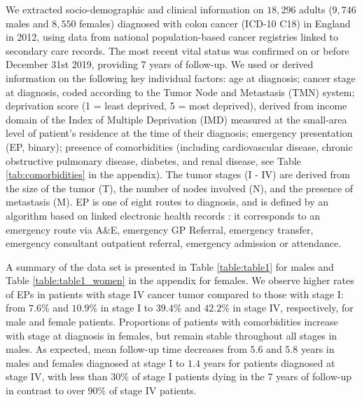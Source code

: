 \documentclass[12pt]{article}
\begin{document}

We extracted socio-demographic and clinical information on $18,296$ adults ($9,746$ males and $8,550$ females) diagnosed with colon cancer (ICD-10 C18) in England in 2012, using data from national population-based cancer registries linked to secondary care records. The most recent vital status was confirmed on or before December 31st 2019, providing 7 years of follow-up. 
We used or derived information on the following key individual factors: age at diagnosis; cancer stage at diagnosis, coded according to the Tumor Node and Metastasis (TMN) system; deprivation score (1 = least deprived, 5 = most deprived), derived from income domain of the Index of Multiple Deprivation (IMD) measured at the small-area level of patient's residence at the time of their diagnosis; emergency presentation (EP, binary); presence of comorbidities (including cardiovascular disease, chronic obstructive pulmonary disease, diabetes, and renal disease, see Table \ref{tab:comorbidities} in the appendix). The tumor stages (I - IV) are derived from the size of the tumor (T), the number of nodes involved (N), and the presence of metastasis (M). EP is one of eight routes to diagnosis, and is defined by an algorithm based on linked electronic health records \citep{elliss:2012}: it corresponds to an emergency route via A\&E, emergency GP Referral, emergency transfer, emergency consultant outpatient referral, emergency admission or attendance.

A summary of the data set is presented in Table \ref{table:table1} for males and Table \ref{table:table1_women} in the appendix for females. We observe higher rates of EPs in patients with stage IV cancer tumor compared to those with stage I: from $7.6\%$ and $10.9\%$ in stage I to $39.4\%$ and $42.2\%$ in stage IV, respectively, for male and female patients. Proportions of patients with comorbidities increase with stage at diagnosis in females, but remain stable throughout all stages in males. As expected, mean follow-up time decreases from $5.6$ and $5.8$ years in males and females diagnosed at stage I to $1.4$ years for patients diagnosed at stage IV, with less than $30\%$ of stage I patients dying in the 7 years of follow-up in contrast to over $90\%$ of stage IV patients.
\end{document}
